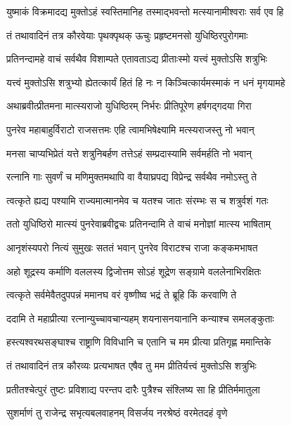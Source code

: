 \twolineshloka
{युष्माकं विक्रमादद्य मुक्तोऽहं स्वस्तिमानिह}
{तस्माद्भवन्तो मत्स्यानामीश्वराः सर्व एव हि}



\twolineshloka
{तं तथावादिनं तत्र कौरवेयाः पृथक्पृथक्}
{ऊचुः प्रहृष्टमनसो युधिष्ठिरपुरोगमाः}


\twolineshloka
{प्रतिनन्दामहे वाचं सर्वथैव विशाम्पते}
{एतावताऽद्य प्रीताःस्मो यत्त्वं मुक्तोऽसि शत्रुभिः}


\twolineshloka
{यत्त्वं मुक्तोऽसि शत्रुभ्यो ह्येतत्कार्यं हितं हि नः}
{न किञ्चित्कार्यमस्माकं न धनं मृगयामहे}


\twolineshloka
{अथाब्रवीत्प्रीतमना मात्स्यराजो युधिष्ठिरम्}
{निर्भरः प्रीतिपूरेण हर्षगद्गदया गिरा}


\twolineshloka
{पुनरेव महाबाहुर्विराटो राजसत्तमः}
{एहि त्वामभिषेक्ष्यामि मत्स्यराजस्तु नो भवान्}


\twolineshloka
{मनसा चाप्यभिप्रेतं यत्ते शत्रुनिबर्हण}
{तत्तेऽहं सम्प्रदास्यामि सर्वमर्हति नो भवान्}


\twolineshloka
{रत्नानि गाः सुवर्णं च मणिमुक्तमथापि वा}
{वैयाघ्रपद्य विप्रेन्द्र सर्वथैव नमोऽस्तु ते}


\twolineshloka
{त्वत्कृते ह्यद्य पश्यामि राज्यमात्मानमेव च}
{यतश्च जातः संरम्भः स च शत्रुर्वशं गतः}


\twolineshloka
{ततो युधिष्ठिरो मात्स्यं पुनरेवाब्रवीद्वचः}
{प्रतिनन्दामि ते वाचं मनोज्ञां मात्स्य भाषिताम्}


\twolineshloka
{आनृशंस्यपरो नित्यं सुमुखः सततं भवान्}
{पुनरेव विराटश्च राजा कङ्कमभाषत}


\twolineshloka
{अहो शूद्रस्य कर्माणि वललस्य द्विजोत्तम}
{सोऽहं शूद्रेण सङ्ग्रामे वललेनाभिरक्षितः}


\twolineshloka
{त्वत्कृते सर्वमेवैतदुपपन्नं ममानघ}
{वरं वृष्णीष्व भद्रं ते ब्रूहि किं करवाणि ते}


\twolineshloka
{ददामि ते महाप्रीत्या रत्नान्युच्चावचान्यहम्}
{शयनासनयानानि कन्याश्च समलङ्कुताः}


\twolineshloka
{हस्त्यश्वरथसङ्घाश्च राष्ट्राणि विविधानि च}
{एतानि च मम प्रीत्या प्रतिगृह्ण ममान्तिके}



\twolineshloka
{तं तथावादिनं तत्र कौरव्यः प्रत्यभाषत}
{एषैव तु मम प्रीतिर्यत्त्वं मुक्तोऽसि शत्रुभिः}


\twolineshloka
{प्रतीतश्चेत्पुरं तुष्टः प्रविशाद्य परन्तप}
{दारैः पुत्रैश्च संश्लिष्य सा हि प्रीतिर्ममातुला}


\twolineshloka
{सुशर्माणं तु राजेन्द्र सभृत्यबलवाहनम्}
{विसर्जय नरश्रेष्ठं वरमेतदहं वृणे}


